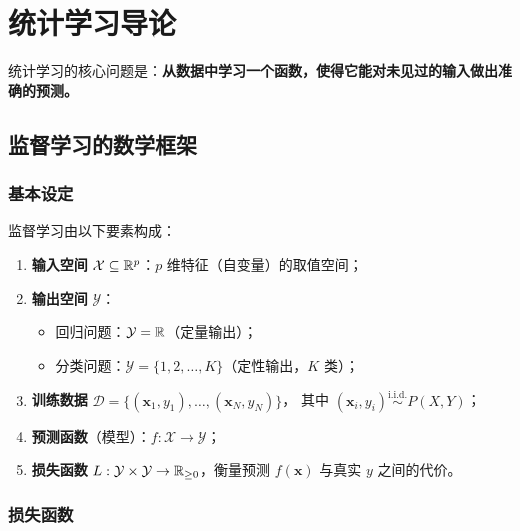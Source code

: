 \chapter{统计学习导论}

统计学习的核心问题是：\textbf{从数据中学习一个函数，使得它能对未见过的输入做出准确的预测。}

\section{监督学习的数学框架}

\subsection{基本设定}

\begin{definition}[监督学习的构成要素]
监督学习由以下要素构成：
\begin{enumerate}[label=(\roman*)]
    \item \textbf{输入空间} $\mathcal{X} \subseteq \mathbb{R}^p$：$p$ 维特征（自变量）的取值空间；
    \item \textbf{输出空间} $\mathcal{Y}$：
    \begin{itemize}
        \item 回归问题：$\mathcal{Y} = \mathbb{R}$（定量输出）；
        \item 分类问题：$\mathcal{Y} = \{1, 2, \dots, K\}$（定性输出，$K$ 类）；
    \end{itemize}
    \item \textbf{训练数据} $\mathcal{D} = \{(\mathbf{x}_1, y_1), \dots, (\mathbf{x}_N, y_N)\}$，
    其中 $(\mathbf{x}_i, y_i) \stackrel{\mathrm{i.i.d.}}{\sim} P(X, Y)$；
    \item \textbf{预测函数}（模型）：$f: \mathcal{X} \to \mathcal{Y}$；
    \item \textbf{损失函数} $L: \mathcal{Y} \times \mathcal{Y} \to \mathbb{R}_{\ge 0}$，衡量预测 $f(\mathbf{x})$ 与真实 $y$ 之间的代价。
\end{enumerate}
\end{definition}

\subsection{损失函数}

